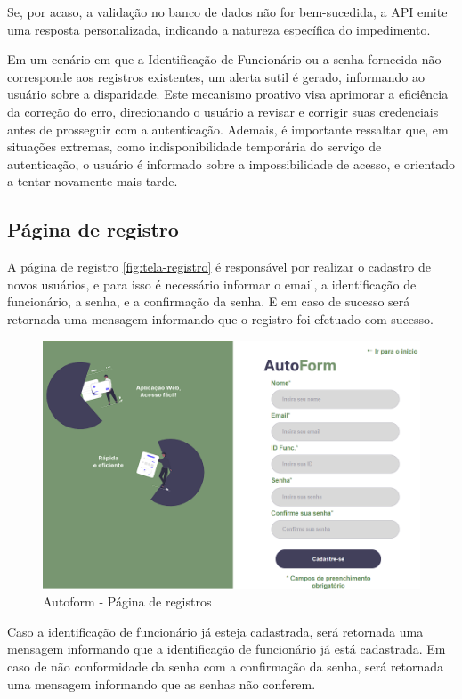  Se, por acaso, a validação no banco de dados não for bem-sucedida, a API emite uma resposta personalizada, indicando a natureza específica do impedimento.

Em um cenário em que a Identificação de Funcionário ou a senha fornecida não corresponde aos registros existentes, um alerta sutil é gerado, informando ao usuário sobre a disparidade. Este mecanismo proativo visa aprimorar a eficiência da correção do erro, direcionando o usuário a revisar e corrigir suas credenciais antes de prosseguir com a autenticação.
Ademais, é importante ressaltar que, em situações extremas, como indisponibilidade temporária do serviço de autenticação, o usuário é informado sobre a impossibilidade de acesso, e orientado a tentar novamente mais tarde.

\subsection{Página de registro}
A página de registro \autoref{fig:tela-registro} é responsável por realizar o cadastro de novos usuários, e para isso é necessário informar o email, a identificação de funcionário, a senha, e a confirmação da senha. E em caso de sucesso será retornada uma mensagem informando que o registro foi efetuado com sucesso.

\begin{figure}[htb]
    \caption{\label{fig:tela-registro}Autoform - Página de registros}
    \begin{center}
        \includegraphics[scale=0.6]{imagens/registro-autoform.png}   
     \end{center}
\end{figure}
Caso a identificação de funcionário já esteja cadastrada, será retornada uma mensagem informando que a identificação de funcionário já está cadastrada.
Em caso de não conformidade da senha com a confirmação da senha, será retornada uma mensagem informando que as senhas não conferem.

